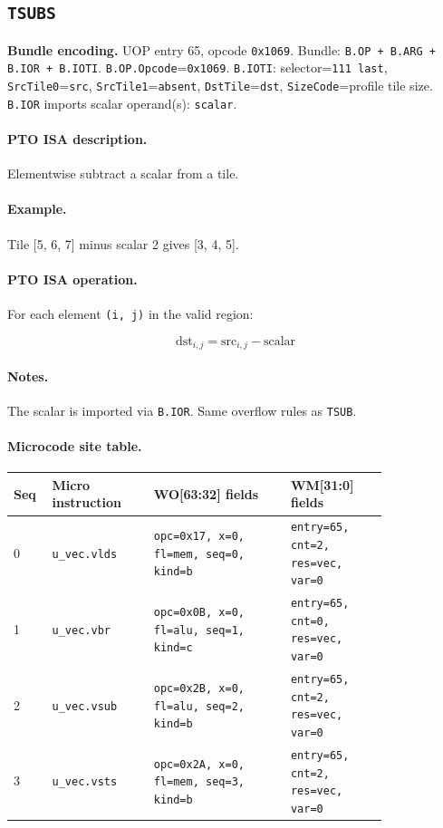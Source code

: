 \subsection{\texttt{TSUBS}}
\noindent\textbf{Bundle encoding.} UOP entry 65, opcode \texttt{0x1069}. Bundle: \texttt{B.OP + B.ARG + B.IOR + B.IOTI}. \texttt{B.OP.Opcode}=\texttt{0x1069}. \texttt{B.IOTI}: selector=\texttt{111 last}, \texttt{SrcTile0}=\texttt{src}, \texttt{SrcTile1}=\texttt{absent}, \texttt{DstTile}=\texttt{dst}, \texttt{SizeCode}=profile tile size. \texttt{B.IOR} imports scalar operand(s): \texttt{scalar}.\par\smallskip
{\small
\paragraph{PTO ISA description.}
Elementwise subtract a scalar from a tile.
\paragraph{Example.}
Tile [5, 6, 7] minus scalar 2 gives [3, 4, 5].
\par\smallskip
\paragraph{PTO ISA operation.}
For each element \texttt{(i, j)} in the valid region:

\[
\mathrm{dst}_{i,j} = \mathrm{src}_{i,j} - \mathrm{scalar}
\]
}\par\smallskip
\paragraph{Notes.}
The scalar is imported via \texttt{B.IOR}. Same overflow rules as \texttt{TSUB}.
\paragraph{Microcode site table.}
{\scriptsize
\begin{longtable}{@{}R{0.055\linewidth}L{0.23\linewidth}L{0.31\linewidth}L{0.22\linewidth}@{}}
\toprule
Seq & Micro instruction & WO[63:32] fields & WM[31:0] fields \\
 & \texttt{u\_vec.vlds} & \texttt{opc=0x17, x=0, fl=mem, seq=0, kind=b} & \texttt{entry=65, cnt=2, res=vec, var=0} \\
1 & \texttt{u\_vec.vbr} & \texttt{opc=0x0B, x=0, fl=alu, seq=1, kind=c} & \texttt{entry=65, cnt=0, res=vec, var=0} \\
2 & \texttt{u\_vec.vsub} & \texttt{opc=0x2B, x=0, fl=alu, seq=2, kind=b} & \texttt{entry=65, cnt=2, res=vec, var=0} \\
3 & \texttt{u\_vec.vsts} & \texttt{opc=0x2A, x=0, fl=mem, seq=3, kind=b} & \texttt{entry=65, cnt=2, res=vec, var=0} \\
\bottomrule
\end{longtable}
}
